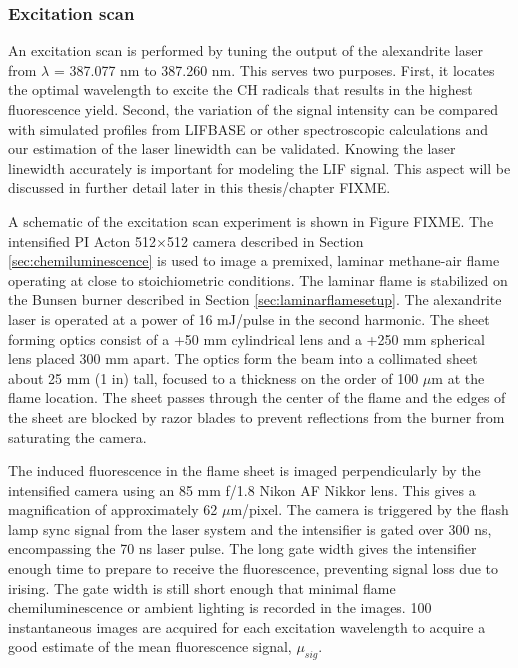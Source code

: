 \subsubsection{Excitation scan}

An excitation scan is performed by tuning the output of the alexandrite laser from \(\lambda\) = 387.077 nm to 387.260 nm.
This serves two purposes.
First, it locates the optimal wavelength to excite the CH radicals that results in the highest fluorescence yield.
Second, the variation of the signal intensity can be compared with simulated profiles from LIFBASE or other spectroscopic calculations and our estimation of the laser linewidth can be validated.
Knowing the laser linewidth accurately is important for modeling the LIF signal.
This aspect will be discussed in further detail later in this thesis/chapter FIXME.

A schematic of the excitation scan experiment is shown in Figure FIXME.
The intensified PI Acton 512\(\times\)512 camera described in Section \ref{sec:chemiluminescence} is used to image a premixed, laminar methane-air flame operating at close to stoichiometric conditions.
The laminar flame is stabilized on the Bunsen burner described in Section \ref{sec:laminarflamesetup}.
The alexandrite laser is operated at a power of 16 mJ/pulse in the second harmonic.
The sheet forming optics consist of a +50 mm cylindrical lens and a +250 mm spherical lens placed 300 mm apart.
The optics form the beam into a collimated sheet about 25 mm (1 in) tall, focused to a thickness on the order of 100 \(\mu\)m at the flame location.
The sheet passes through the center of the flame and the edges of the sheet are blocked by razor blades to prevent reflections from the burner from saturating the camera.

The induced fluorescence in the flame sheet is imaged perpendicularly by the intensified camera using an 85 mm f/1.8 Nikon AF Nikkor lens.
This gives a magnification of approximately 62 \(\mu\)m/pixel.
The camera is triggered by the flash lamp sync signal from the laser system and the intensifier is gated over 300 ns, encompassing the 70 ns laser pulse.
The long gate width gives the intensifier enough time to prepare to receive the fluorescence, preventing signal loss due to irising.
The gate width is still short enough that minimal flame chemiluminescence or ambient lighting is recorded in the images.
100 instantaneous images are acquired for each excitation wavelength to acquire a good estimate of the mean fluorescence signal, \(\mu_{sig}\).

